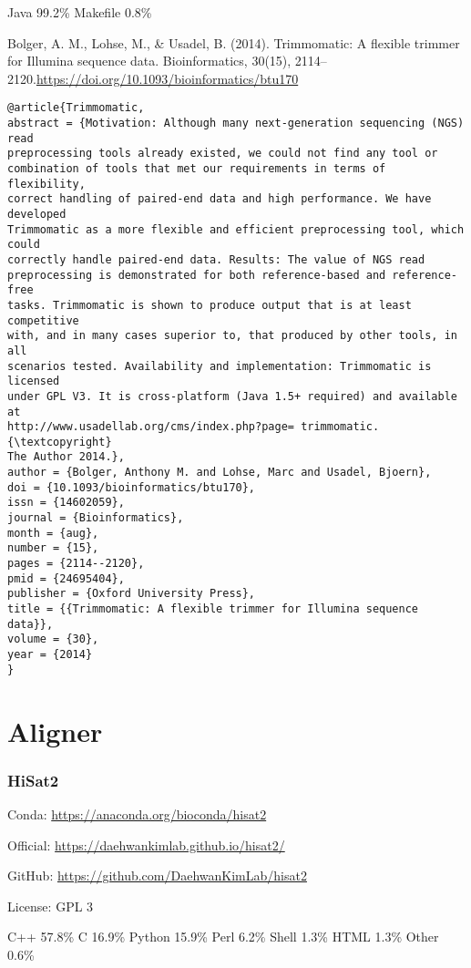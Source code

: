 \documentclass[]{article}
\begin{document}
Java 99.2\% Makefile 0.8\%



Bolger, A. M., Lohse, M., \& Usadel, B. (2014). Trimmomatic: A flexible trimmer for Illumina sequence data. Bioinformatics, 30(15), 2114–2120.\url{https://doi.org/10.1093/bioinformatics/btu170}

\begin{verbatim}
@article{Trimmomatic,
abstract = {Motivation: Although many next-generation sequencing (NGS) read
preprocessing tools already existed, we could not find any tool or
combination of tools that met our requirements in terms of flexibility,
correct handling of paired-end data and high performance. We have developed
Trimmomatic as a more flexible and efficient preprocessing tool, which could
correctly handle paired-end data. Results: The value of NGS read
preprocessing is demonstrated for both reference-based and reference-free
tasks. Trimmomatic is shown to produce output that is at least competitive
with, and in many cases superior to, that produced by other tools, in all
scenarios tested. Availability and implementation: Trimmomatic is licensed
under GPL V3. It is cross-platform (Java 1.5+ required) and available at
http://www.usadellab.org/cms/index.php?page= trimmomatic. {\textcopyright}
The Author 2014.},
author = {Bolger, Anthony M. and Lohse, Marc and Usadel, Bjoern},
doi = {10.1093/bioinformatics/btu170},
issn = {14602059},
journal = {Bioinformatics},
month = {aug},
number = {15},
pages = {2114--2120},
pmid = {24695404},
publisher = {Oxford University Press},
title = {{Trimmomatic: A flexible trimmer for Illumina sequence data}},
volume = {30},
year = {2014}
}
\end{verbatim}

\part{Aligner}

\section{HiSat2}

Conda: \url{https://anaconda.org/bioconda/hisat2}

Official: \url{https://daehwankimlab.github.io/hisat2/}

GitHub: \url{https://github.com/DaehwanKimLab/hisat2}

License: GPL 3

C++ 57.8\% C 16.9\% Python 15.9\% Perl 6.2\% Shell 1.3\% HTML 1.3\% Other 0.6\%
\end{document}
